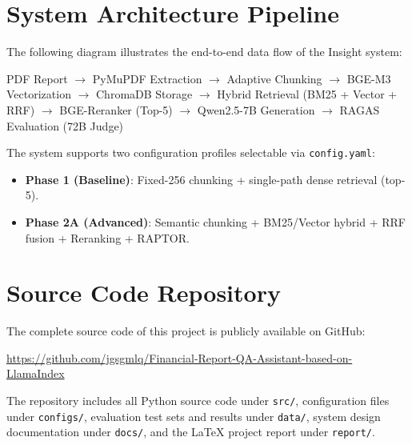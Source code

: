 \documentclass[11pt, a4paper]{article}
\begin{document}
\section{System Architecture Pipeline}

The following diagram illustrates the end-to-end data flow of the Insight system:

\begin{center}
\small
PDF Report $\rightarrow$ PyMuPDF Extraction $\rightarrow$ Adaptive Chunking $\rightarrow$ BGE-M3 Vectorization $\rightarrow$ ChromaDB Storage $\rightarrow$ Hybrid Retrieval (BM25 + Vector + RRF) $\rightarrow$ BGE-Reranker (Top-5) $\rightarrow$ Qwen2.5-7B Generation $\rightarrow$ RAGAS Evaluation (72B Judge)
\end{center}

\noindent The system supports two configuration profiles selectable via \texttt{config.yaml}:
\begin{itemize}[nosep]
    \item \textbf{Phase 1 (Baseline)}: Fixed-256 chunking + single-path dense retrieval (top-5).
    \item \textbf{Phase 2A (Advanced)}: Semantic chunking + BM25/Vector hybrid + RRF fusion + Reranking + RAPTOR.
\end{itemize}

\section{Source Code Repository}

The complete source code of this project is publicly available on GitHub:

\begin{center}
\url{https://github.com/jgsgmlq/Financial-Report-QA-Assistant-based-on-LlamaIndex}
\end{center}

\noindent The repository includes all Python source code under \texttt{src/}, configuration files under \texttt{configs/}, evaluation test sets and results under \texttt{data/}, system design documentation under \texttt{docs/}, and the LaTeX project report under \texttt{report/}.
\end{document}
